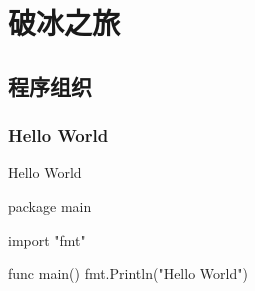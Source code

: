 \begin{savequote}[45mm]
\end{savequote}

\chapter{破冰之旅} 
\label{ch:quick-start}

\begin{content}

\end{content}

\section{程序组织}

\begin{content}

\subsection{Hello World}

\begin{nodiff}{Hello World}
 \begin{go}
package main

import "fmt" 

func main() {
    fmt.Println("Hello World")
}
 \end{go}
\end{nodiff}

\end{content}
